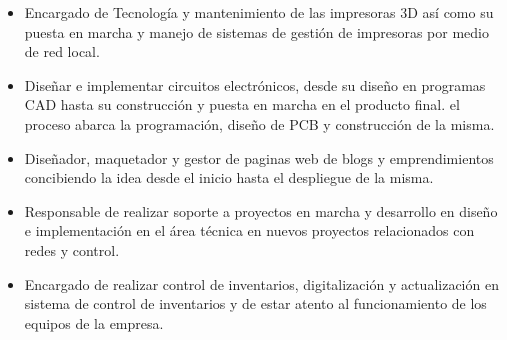 \documentclass[10pt,a4paper]{altacv}
\begin{document}
\begin{itemize}

\item {}
Encargado de Tecnología y mantenimiento de las impresoras 3D así como su puesta en marcha y manejo de sistemas de gestión de impresoras por medio de red local.\\
\divider

\item {}
Diseñar e implementar circuitos electrónicos, desde su diseño en programas CAD hasta su construcción y puesta en marcha en el producto final. el proceso abarca la programación, diseño de PCB y construcción de la misma. 
\divider

\item {}
Diseñador, maquetador y gestor de paginas web de blogs y emprendimientos concibiendo la idea desde el inicio hasta el despliegue de la misma.\\
\divider

\item {}
Responsable de realizar soporte a proyectos en marcha y desarrollo en diseño e implementación en el área técnica en nuevos proyectos relacionados con redes y control.\\
\divider

\item {}
Encargado de realizar control de inventarios, digitalización y actualización en sistema de control de inventarios y de estar atento al funcionamiento de los equipos de la empresa.
\hspace{40mm}
\end{itemize}
    
\end{document}
